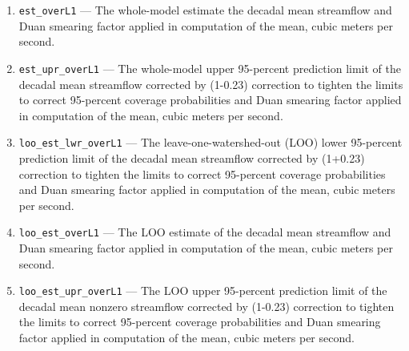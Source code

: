 \documentclass[1p, authoryear, 11pt, times, preprint]{elsarticle}
\newcommand{\code}[1]{{\color{black}%
                       \mbox{\lstinline[basicstyle={\small\ttfamily},
                                        keywordstyle=\scriptsize\ttfamily]|#1|}}}
\begin{document}
\begin{enumerate}
\item \code{est_overL1} --- The whole-model estimate the decadal mean streamflow and Duan smearing factor applied in computation of the mean, cubic meters per second.
\item \code{est_upr_overL1} --- The whole-model upper 95-percent prediction limit of the decadal mean streamflow corrected by (1-0.23) correction to tighten the limits to correct 95-percent coverage probabilities and Duan smearing factor applied in computation of the mean, cubic meters per second.
\item \code{loo_est_lwr_overL1} --- The leave-one-watershed-out (LOO) lower 95-percent prediction limit of the decadal mean streamflow corrected by (1+0.23) correction to tighten the limits to correct 95-percent coverage probabilities and Duan smearing factor applied in computation of the mean, cubic meters per second.
\item \code{loo_est_overL1} --- The LOO estimate of the decadal mean streamflow and Duan smearing factor applied in computation of the mean, cubic meters per second.
\item \code{loo_est_upr_overL1} --- The LOO upper 95-percent prediction limit of the decadal mean nonzero streamflow corrected by (1-0.23) correction to tighten the limits to correct 95-percent coverage probabilities and Duan smearing factor applied in computation of the mean, cubic meters per second.
\end{enumerate}
\end{document}
